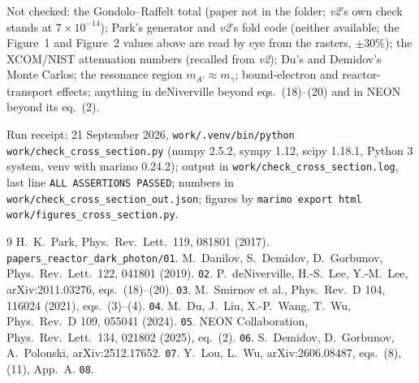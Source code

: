 \documentclass[11pt,a4paper]{article}
\newcommand{\Ap}{A'}
\begin{document}
Not checked: the Gondolo--Raffelt total (paper not in the folder; \emph{v2}'s own check stands at $7\times10^{-14}$);
Park's generator and \emph{v2}'s fold code (neither available; the Figure~1 and Figure~2 values above are read by eye
from the rasters, $\pm30\%$); the XCOM/NIST attenuation numbers (recalled from
\emph{v2}); Du's and Demidov's Monte Carlos; the resonance region $m_{\Ap}\approx m_\gamma$; bound-electron and
reactor-transport effects; anything in deNiverville beyond eqs.~(18)--(20) and in NEON beyond its eq.~(2).

\medskip\noindent\sloppy
Run receipt: 21 September 2026, \texttt{work/.venv/bin/python work/check\_cross\_section.py} (numpy 2.5.2, sympy 1.12,
scipy 1.18.1, Python 3 system, venv with marimo 0.24.2); output in \texttt{work/check\_cross\_section.log}, last line
\texttt{ALL ASSERTIONS PASSED}; numbers in \texttt{work/check\_cross\_section\_out.json}; figures by
\texttt{marimo export html work/figures\_cross\_section.py}.

\begin{thebibliography}{9}\small
{} H.~K.~Park, Phys.\ Rev.\ Lett.\ 119, 081801 (2017). \texttt{papers\_reactor\_dark\_photon/01}.
 M.~Danilov, S.~Demidov, D.~Gorbunov, Phys.\ Rev.\ Lett.\ 122, 041801 (2019). \texttt{02}.
 P.~deNiverville, H.-S.~Lee, Y.-M.~Lee, arXiv:2011.03276, eqs.~(18)--(20). \texttt{03}.
 M.~Smirnov et al., Phys.\ Rev.\ D 104, 116024 (2021), eqs.~(3)--(4). \texttt{04}.
 M.~Du, J.~Liu, X.-P.~Wang, T.~Wu, Phys.\ Rev.\ D 109, 055041 (2024). \texttt{05}.
 NEON Collaboration, Phys.\ Rev.\ Lett.\ 134, 021802 (2025), eq.~(2). \texttt{06}.
 S.~Demidov, D.~Gorbunov, A.~Polonski, arXiv:2512.17652. \texttt{07}.
 Y.~Lou, L.~Wu, arXiv:2606.08487, eqs.~(8), (11), App.~A. \texttt{08}.
\end{thebibliography}
\end{document}
